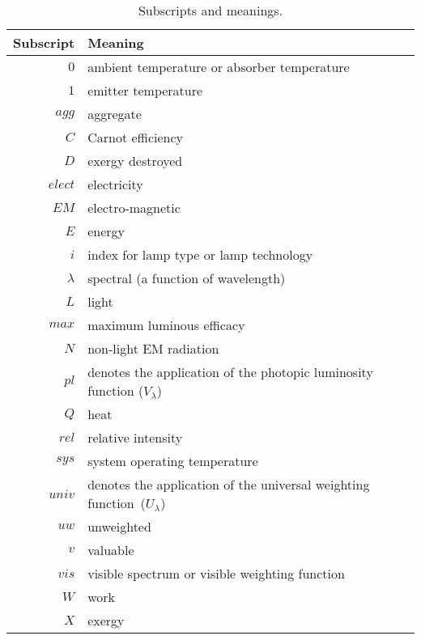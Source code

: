   
\begin{table}
\centering
\caption{Subscripts and meanings.}
\begin{tabular}{r l}
\toprule
Subscript & Meaning \\
\midrule
$0$ & ambient temperature or absorber temperature \\
$1$ & emitter temperature \\
$agg$ & aggregate \\
$C$ & Carnot efficiency \\
$D$ & exergy destroyed \\
$elect$ & electricity \\
$E\!M$ & electro-magnetic \\
$E$ & energy \\
$i$ & index for lamp type or lamp technology \\
$\lambda$ & spectral (a function of wavelength) \\
$L$ & light \\
$max$ & maximum luminous efficacy \\
$N$ & non-light EM radiation \\
$pl$ & denotes the application of the photopic luminosity function ($V_{\lambda}$) \\
$Q$ & heat \\
$rel$ & relative intensity \\
$sys$ & system operating temperature \\
$univ$ & denotes the application of the universal weighting function~($U_\lambda$) \\
$uw$ & unweighted \\
$v$ & valuable \\
$vis$ & visible spectrum or visible weighting function \\
$W$ & work \\
$X$ & exergy \\
\bottomrule
\end{tabular}
\label{tab:subscripts}
\end{table}



